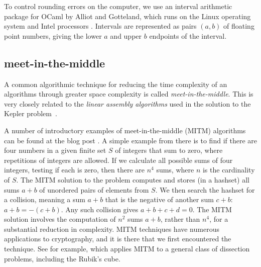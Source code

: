 To control rounding errors on the computer, we use an interval
arithmetic package for OCaml by Alliot and Gotteland, which runs on
the Linux operating system and Intel processors \cite{All}.  Intervals
are represented as pairs $(a,b)$ of floating point numbers, giving the
lower $a$ and upper $b$ endpoints of the interval.

\subsection{meet-in-the-middle}

A common algorithmic technique for reducing the time complexity of an
algorithms through greater space complexity is called {\it
  meet-in-the-middle}.  This is very closely related to the {\it
  linear assembly algorithms} used in the solution to the Kepler
problem~\cite{hales2003some}.

A number of introductory examples of meet-in-the-middle (MITM)
algorithms can be found at the blog post \cite{mitm}.
A simple example from there is to find if there are four numbers in a
given finite set $S$ of integers that sum to zero, where repetitions
of integers are allowed.  If we calculate all possible sums of four
integers, testing if each is zero, then there are $n^4$ sums, where
$n$ is the cardinality of $S$.  The MITM solution to the problem
computes and stores (in a hashset) all sums $a+b$ of unordered pairs
of elements from $S$.  We then search the hashset for a collision,
meaning a sum $a+b$ that is the negative of another sum $c+b$: $a+b =
-(c+b)$.  Any such collision gives $a+b+c+d=0$.  The MITM solution
involves the computation of $n^2$ sums $a+b$, rather than $n^4$, for a
substantial reduction in complexity.  MITM techniques have numerous
applications to cryptography, and it is there that we first
encountered the technique.  See for example,
\cite{dinur2014dissection}
which applies MITM to a general class of dissection problems,
including the Rubik's cube.

